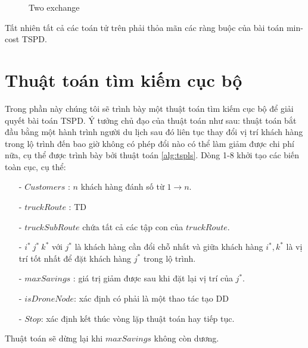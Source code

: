 \documentclass[a4paper,12pt]{report}
\begin{document}
\begin{itemize}
\begin{enumerate}
\begin{figure}[H]
\caption{Two exchange}\label{opeatorTE}
\end{figure}
\end{enumerate}
\end{itemize}
Tất nhiên tất cả các toán tử trên phải thỏa mãn các ràng buộc của bài toán min-cost TSPD.
\section{Thuật toán tìm kiếm cục bộ}
\label{section:tsp-ls}
Trong phần này chúng tôi sẽ trình bày một thuật toán tìm kiếm cục bộ để giải quyết bài toán TSPD. Ý tưởng chủ đạo của thuật toán như sau: thuật toán bắt đầu bằng một hành trình người du lịch sau đó liên tục thay đổi vị trí khách hàng trong lộ trình đến bao giờ không có phép đổi nào có thể làm giảm được chi phí nữa, cụ thể được trình bày bởi thuật toán \ref{alg:tspls}. Dòng 1-8 khởi tạo các biến toàn cục, cụ thể:
\begin{itemize}
\item[-] $Customers$ : $n$ khách hàng đánh số từ $1\rightarrow n$.
\item[-] $truckRoute$ : \ac{TD}
\item[-] $truckSubRoute$ chứa  tất cả các tập con của $truckRoute$.
\item[-] $i^* \ j^* \ k^*$ với $j^*$ là khách hàng cần đổi chỗ nhất và giữa khách hàng $i^* ,k^*$ là vị trí tốt nhất để đặt khách hàng $j^*$ trong lộ trình.
\item[-] $maxSavings$ : giá trị giảm được sau khi đặt lại vị trí của $j^*$.
\item[-] $isDroneNode$: xác định có phải là một thao tác tạo \ac{DD}
\item[-] $Stop$: xác định kết thúc vòng lặp thuật toán hay tiếp tục.
\end{itemize}
Thuật toán sẽ dừng lại khi $maxSavings$ không còn dương. \\
\end{document}
